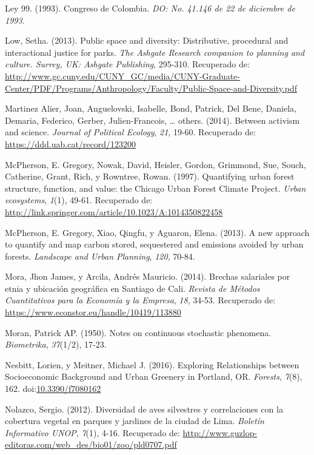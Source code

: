 \documentclass[12pt,a4paper,openany]{book}
\theoremstyle{definition}
\theoremstyle{definition}
\theoremstyle{definition}
\theoremstyle{remark}
\begin{document}
\hypertarget{ref-ley99col}{}
Ley 99. (1993). Congreso de Colombia. \emph{DO: No. 41.146 de 22 de
diciembre de 1993}.

\hypertarget{ref-low_public_2013}{}
Low, Setha. (2013). Public space and diversity: Distributive, procedural
and interactional justice for parks. \emph{The Ashgate Research
companion to planning and culture. Surrey, UK: Ashgate Publishing},
295-310. Recuperado de:
\url{http://www.gc.cuny.edu/CUNY_GC/media/CUNY-Graduate-Center/PDF/Programs/Anthropology/Faculty/Public-Space-and-Diversity.pdf}

\hypertarget{ref-martinez_alier_between_2014}{}
Martinez Alier, Joan, Anguelovski, Isabelle, Bond, Patrick, Del Bene,
Daniela, Demaria, Federico, Gerber, Julien-Francois, \ldots{} others.
(2014). Between activism and science. \emph{Journal of Political
Ecology}, \emph{21}, 19-60. Recuperado de:
\url{https://ddd.uab.cat/record/123200}

\hypertarget{ref-mcpherson_quantifying_1997}{}
McPherson, E. Gregory, Nowak, David, Heisler, Gordon, Grimmond, Sue,
Souch, Catherine, Grant, Rich, y Rowntree, Rowan. (1997). Quantifying
urban forest structure, function, and value: the Chicago Urban Forest
Climate Project. \emph{Urban ecosystems}, \emph{1}(1), 49-61. Recuperado
de: \url{http://link.springer.com/article/10.1023/A:1014350822458}

\hypertarget{ref-mcpherson2013new}{}
McPherson, E. Gregory, Xiao, Qingfu, y Aguaron, Elena. (2013). A new
approach to quantify and map carbon stored, sequestered and emissions
avoided by urban forests. \emph{Landscape and Urban Planning},
\emph{120}, 70-84.

\hypertarget{ref-mora_brechas_2014}{}
Mora, Jhon James, y Arcila, Andrés Mauricio. (2014). Brechas salariales
por etnia y ubicación geográfica en Santiago de Cali. \emph{Revista de
Métodos Cuantitativos para la Economía y la Empresa}, \emph{18}, 34-53.
Recuperado de: \url{https://www.econstor.eu/handle/10419/113880}

\hypertarget{ref-moran1950notes}{}
Moran, Patrick AP. (1950). Notes on continuous stochastic phenomena.
\emph{Biometrika}, \emph{37}(1/2), 17-23.

\hypertarget{ref-nesbitt_exploring_2016}{}
Nesbitt, Lorien, y Meitner, Michael J. (2016). Exploring Relationships
between Socioeconomic Background and Urban Greenery in Portland, OR.
\emph{Forests}, \emph{7}(8), 162.
doi:\href{https://doi.org/10.3390/f7080162}{10.3390/f7080162}

\hypertarget{ref-nolazco_diversidad_2012}{}
Nolazco, Sergio. (2012). Diversidad de aves silvestres y correlaciones
con la cobertura vegetal en parques y jardines de la ciudad de Lima.
\emph{Boletín Informativo UNOP}, \emph{7}(1), 4-16. Recuperado de:
\url{http://www.guzlop-editoras.com/web_des/bio01/zoo/pld0707.pdf}
\end{document}
